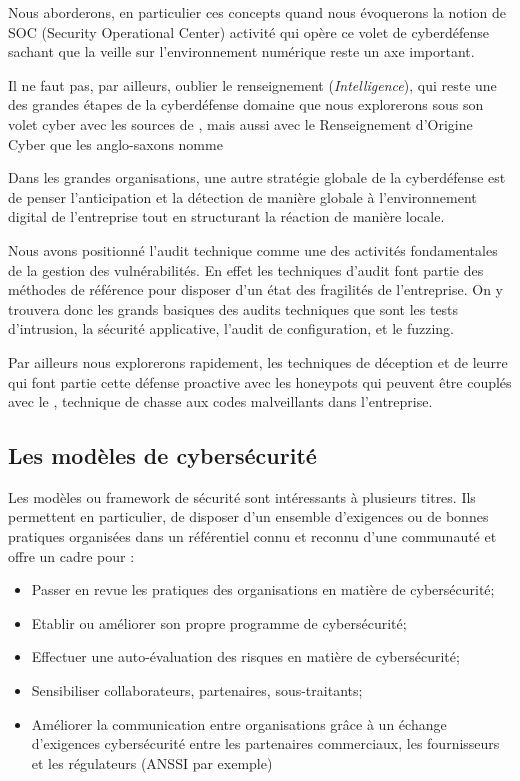 Nous aborderons, en particulier ces concepts quand nous évoquerons la notion de SOC (Security Operational Center) activité qui opère ce volet de cyberdéfense sachant que la veille sur l'environnement numérique reste un axe important.




Il ne faut pas, par ailleurs, oublier le renseignement (\textit{Intelligence}), qui reste une des grandes étapes de la cyberdéfense domaine que nous explorerons sous son volet cyber avec les sources de , mais aussi avec le Renseignement d'Origine Cyber que les anglo-saxons nomme 

Dans les grandes organisations, une autre stratégie globale de la cyberdéfense est de penser l'anticipation et la détection de manière globale à l'environnement digital de l'entreprise tout en structurant la réaction de manière locale. 


Nous avons positionné l'audit technique comme une des activités fondamentales de la gestion des vulnérabilités.
En effet les techniques d'audit font partie des méthodes de référence pour disposer d'un état des fragilités de l'entreprise. On y trouvera donc les grands basiques des audits techniques que sont les tests d'intrusion, la sécurité applicative, l'audit de configuration, et le fuzzing.

Par ailleurs nous explorerons rapidement, les techniques de déception et de leurre qui font partie cette défense proactive avec les honeypots qui peuvent être couplés avec le , technique de chasse aux codes malveillants dans l'entreprise.
 

\subsection{Les modèles de cybersécurité}

Les modèles ou framework de sécurité sont intéressants à plusieurs titres. Ils permettent en particulier, de disposer d'un ensemble d'exigences ou de bonnes pratiques organisées dans un référentiel connu et reconnu d'une communauté et  offre un cadre pour : 

\begin{itemize}
  \item Passer en revue les pratiques des organisations en matière de cybersécurité;
  \item Etablir ou améliorer son propre programme de cybersécurité;
  \item Effectuer une auto-évaluation des risques en matière de cybersécurité;
  \item Sensibiliser collaborateurs, partenaires, sous-traitants;
  \item Améliorer la communication entre organisations grâce à un échange d’exigences cybersécurité entre les partenaires commerciaux, les fournisseurs et les régulateurs (ANSSI par exemple)
\end{itemize}


